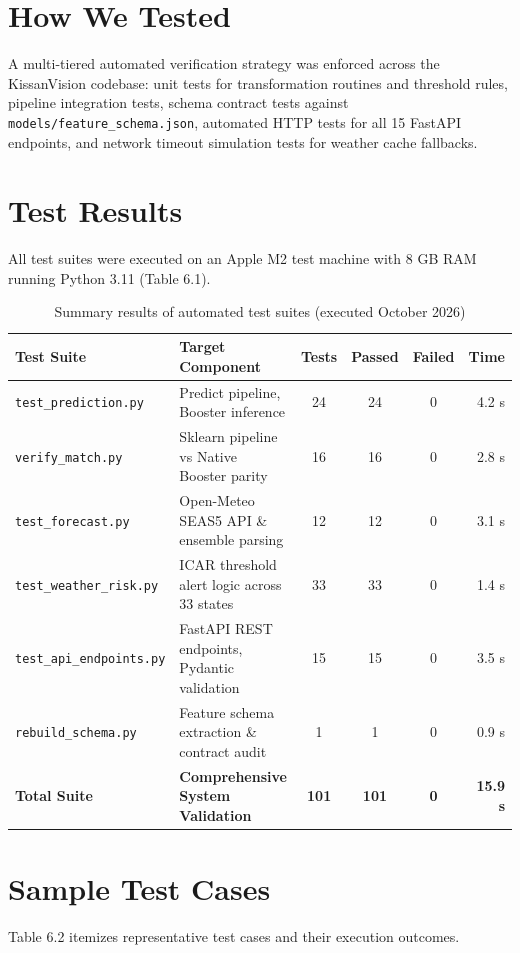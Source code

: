 \documentclass[11pt,a4paper]{report}
\begin{document}
\section{How We Tested}
A multi-tiered automated verification strategy was enforced across the KissanVision codebase: unit tests for transformation routines and threshold rules, pipeline integration tests, schema contract tests against \texttt{models/feature\_schema.json}, automated HTTP tests for all 15 FastAPI endpoints, and network timeout simulation tests for weather cache fallbacks.

\section{Test Results}
All test suites were executed on an Apple M2 test machine with 8 GB RAM running Python 3.11 (Table 6.1).

\begin{table}[htbp]
\centering
\small
\caption{Summary results of automated test suites (executed October 2026)}
\begin{tabularx}{\textwidth}{lXcccr}
\toprule
\textbf{Test Suite} & \textbf{Target Component} & \textbf{Tests} & \textbf{Passed} & \textbf{Failed} & \textbf{Time} \\
\midrule
\texttt{test\_prediction.py} & Predict pipeline, Booster inference & 24 & 24 & 0 & 4.2 s \\
\texttt{verify\_match.py} & Sklearn pipeline vs Native Booster parity & 16 & 16 & 0 & 2.8 s \\
\texttt{test\_forecast.py} & Open-Meteo SEAS5 API \& ensemble parsing & 12 & 12 & 0 & 3.1 s \\
\texttt{test\_weather\_risk.py}& ICAR threshold alert logic across 33 states & 33 & 33 & 0 & 1.4 s \\
\texttt{test\_api\_endpoints.py}& FastAPI REST endpoints, Pydantic validation & 15 & 15 & 0 & 3.5 s \\
\texttt{rebuild\_schema.py} & Feature schema extraction \& contract audit & 1 & 1 & 0 & 0.9 s \\
\midrule
\textbf{Total Suite} & \textbf{Comprehensive System Validation} & \textbf{101} & \textbf{101} & \textbf{0} & \textbf{15.9 s} \\
\bottomrule
\end{tabularx}
\end{table}

\section{Sample Test Cases}
Table 6.2 itemizes representative test cases and their execution outcomes.
\end{document}

